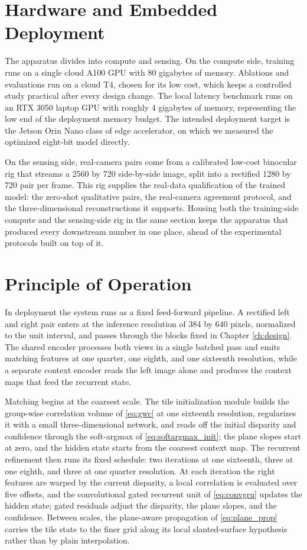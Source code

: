 \FloatBarrier
\section{Hardware and Embedded Deployment}
\label{sec:hw_deployment}
The apparatus divides into compute and sensing. On the compute side,
training runs on a single cloud A100 GPU with 80 gigabytes of memory.
Ablations and evaluations run on a cloud T4, chosen for its low cost,
which keeps a controlled study practical after every design change. The
local latency benchmark runs on an RTX 3050 laptop GPU with roughly 4
gigabytes of memory, representing the low end of the deployment memory
budget. The intended deployment target is the Jetson Orin Nano class of
edge accelerator, on which we measured the optimized eight-bit model
directly.

On the sensing side, real-camera pairs come from a calibrated low-cost
binocular rig that streams a 2560 by 720 side-by-side image, split into
a rectified 1280 by 720 pair per frame. This rig supplies the real-data
qualification of the trained model: the zero-shot qualitative pairs, the
real-camera agreement protocol, and the three-dimensional
reconstructions it supports. Housing both
the training-side compute and the sensing-side rig in the same section
keeps the apparatus that produced every downstream number in one place,
ahead of the experimental protocols built on top of it.

\FloatBarrier
\section{Principle of Operation}
\label{sec:principle_of_operation}
In deployment the system runs as a fixed feed-forward pipeline. A
rectified left and right pair enters at the inference resolution of 384
by 640 pixels, normalized to the unit interval, and passes through the
blocks fixed in Chapter \ref{ch:design}. The shared encoder processes
both views in a single batched pass and emits matching features at one
quarter, one eighth, and one sixteenth resolution, while a separate
context encoder reads the left image alone and produces the context
maps that feed the recurrent state.

Matching begins at the coarsest scale. The tile initialization module
builds the group-wise correlation volume of \eqref{eq:gwc} at one
sixteenth resolution, regularizes it with a small three-dimensional
network, and reads off the initial disparity and confidence through the
soft-argmax of \eqref{eq:softargmax_init}; the plane slopes start at
zero, and the hidden state starts from the coarsest context map. The
recurrent refinement then runs its fixed schedule: two iterations at
one sixteenth, three at one eighth, and three at one quarter resolution.
At each iteration the right features are warped by the current
disparity, a local correlation is evaluated over five offsets, and the
convolutional gated recurrent unit of \eqref{eq:convgru} updates the
hidden state; gated residuals adjust the disparity, the plane slopes,
and the confidence. Between scales, the plane-aware propagation of
\eqref{eq:plane_prop} carries the tile state to the finer grid along its
local slanted-surface hypothesis rather than by plain interpolation.

